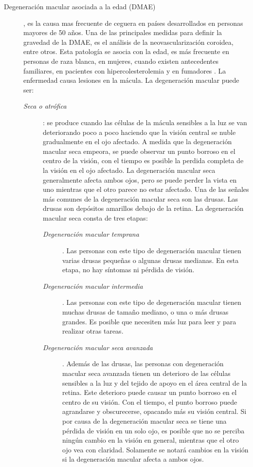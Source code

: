 \begin{description}
\item[Degeneraci\'on macular asociada a la edad (DMAE)] , es la causa mas frecuente de ceguera en pa\'ises desarrollados en personas mayores de 50 a\~nos. Una de las principales medidas para definir la gravedad de la DMAE, es el an\'alisis de la neovascularizaci\'on coroidea, entre otros. Esta patolog\'ia se asocia con la edad, es m\'as frecuente en personas de raza blanca, en mujeres, cuando existen antecedentes familiares, en pacientes con hipercolesterolemia y en fumadores \cite{nei:dmae} \cite{lim2012age}. La enfermedad causa lesiones en la m\'acula. La degeneraci\'on macular puede ser:
\begin{description}
	\item[\normalfont\textit{ Seca o atr\'ofica}]: se produce cuando las c\'elulas de la m\'acula sensibles a la luz se van deteriorando poco a poco haciendo que la visi\'on central se nuble gradualmente en el ojo afectado. A medida que la degeneraci\'on macular seca empeora, se puede observar un punto borroso en el centro de la visi\'on, con el tiempo es posible la perdida completa de la visi\'on en el ojo afectado. La degeneraci\'on macular seca generalmente afecta ambos ojos, pero se puede perder la vista en uno mientras que el otro parece no estar afectado. Una de las señales m\'as comunes de la degeneraci\'on macular seca son las drusas. Las drusas son dep\'ositos amarillos debajo de la retina. La degeneraci\'on macular seca consta de tres etapas:
\begin{description}
\item[\normalfont\textit{Degeneraci\'on macular temprana}]. Las personas con este tipo de degeneraci\'on macular tienen varias drusas pequeñas o algunas drusas medianas. En esta etapa, no hay s\'intomas ni p\'erdida de visi\'on.
\item[\normalfont\textit{Degeneraci\'on macular intermedia}]. Las personas con este tipo de degeneraci\'on macular tienen muchas drusas de tamaño mediano, o una o m\'as drusas grandes. Es posible que necesiten m\'as luz para leer y para realizar otras tareas.
\item[\normalfont\textit{Degeneraci\'on macular seca avanzada}]. Adem\'as de las drusas, las personas con degeneraci\'on macular seca avanzada tienen un deterioro de las c\'elulas sensibles a la luz y del tejido de apoyo en el \'area central de la retina. Este deterioro puede causar un punto borroso en el centro de su visi\'on. Con el tiempo, el punto borroso puede agrandarse y obscurecerse, opacando m\'as su visi\'on central. Si por causa de la degeneraci\'on macular seca se tiene una p\'erdida de visi\'on en un solo ojo, es posible que no se perciba ning\'un cambio en la visi\'on en general, mientras que el otro ojo vea con claridad. Solamente  se notar\'a cambios en la visi\'on si la degeneraci\'on macular afecta a ambos ojos. 

\end{description}
\end{description}
\end{description}
